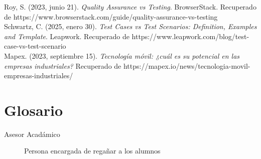 \documentclass[12pt,letterpaper,spanish, xcolor=table]{report}
\numberwithin{figure}{subsection}
\begin{document}
	Roy, S. (2023, junio 21). \textit{Quality Assurance vs Testing}. BrowserStack. Recuperado de https://www.browserstack.com/guide/quality-assurance-vs-testing\\
	
	Schwartz, C. (2025, enero 30). \textit{Test Cases vs Test Scenarios: Definition, Examples and Template}. Leapwork. Recuperado de https://www.leapwork.com/blog/test-case-vs-test-scenario\\
	
	Mapex. (2023, septiembre 15). \textit{Tecnología móvil: ¿cuál es su potencial en las empresas industriales?} Recuperado de https://mapex.io/news/tecnologia-movil-empresas-industriales/\\

\newpage	
\chapter{Glosario}

\begin{description}
	\item[Asesor Acadámico] Persona encargada de regañar a los alumnos
\end{description}
	
\end{document}

